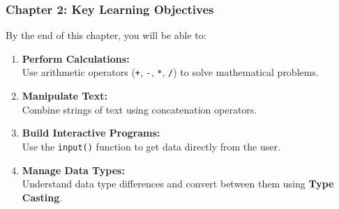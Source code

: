 \documentclass{beamer}
\begin{document}
\begin{frame}[fragile]
    \frametitle{Chapter 2: Key Learning Objectives}
    
    \begin{block}{By the end of this chapter, you will be able to:}
        \begin{enumerate}
            \item \textbf{Perform Calculations:}\\
            Use arithmetic operators (\texttt{+}, \texttt{-}, \texttt{*}, \texttt{/}) to solve mathematical problems.
            
            \vspace{0.5em}
            
            \item \textbf{Manipulate Text:}\\
            Combine strings of text using concatenation operators.
            
            \vspace{0.5em}
            
            \item \textbf{Build Interactive Programs:}\\
            Use the \texttt{input()} function to get data directly from the user.
            
            \vspace{0.5em}
            
            \item \textbf{Manage Data Types:}\\
            Understand data type differences and convert between them using \textbf{Type Casting}.
        \end{enumerate}
    \end{block}
    
\end{frame}
\end{document}

